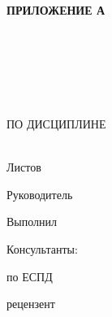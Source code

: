 \begin{ESKDtitlePage}
    \begin{flushright}
        \textbf{ПРИЛОЖЕНИЕ А} \enspace\enspace
    \end{flushright}
    \begin{center}
        \gpiEdu \\
        \gpiKaf \\
    \end{center}

    \vfill

    \begin{center}
        \gpiTopic \\
    \end{center}

    \vfill

    \begin{center}
        \textbf{\gpiDocTopic} \\
        ПО ДИСЦИПЛИНЕ \gpiDiscipline \\
    \end{center}

    \vfill

    \begin{center}
        \gpiCode \\
        Листов \pageref{LastPage} \\
    \end{center}

    \vfill

    \begin{flushright}
        \begin{minipage}[t]{.49\textwidth}
            \begin{minipage}[t]{.75\textwidth}
                \begin{flushright}
                    Руководитель

                    \hspace{0pt}

                    Выполнил

                    \hspace{0pt}

                    Консультанты:

                    по ЕСПД

                    рецензент
                \end{flushright}
            \end{minipage}
        \end{minipage}
        \begin{minipage}[t]{.49\textwidth}
            \begin{flushright}
                \begin{minipage}[t]{.75\textwidth}
                    \gpiTeacherName~\gpiTeacherSurname


\end{minipage}
\end{flushright}
\end{minipage}
\end{flushright}
\end{ESKDtitlePage}
